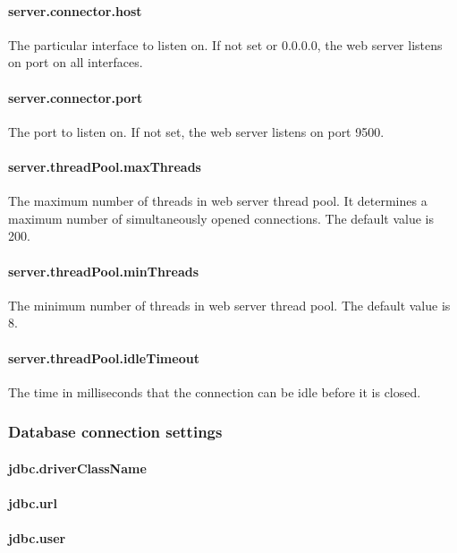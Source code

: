 \documentclass[12pt,a4paper]{report}
\begin{document}
\paragraph{server.connector.host} The particular interface to listen on. If not set or 0.0.0.0, the web server listens on port on all interfaces.

\paragraph{server.connector.port} The port to listen on. If not set, the web server listens on port 9500.

\paragraph{server.threadPool.maxThreads} The maximum number of threads in web server thread pool. It determines a maximum number of simultaneously opened connections. The default value is 200.

\paragraph{server.threadPool.minThreads} The minimum number of threads in web server thread pool. The default value is 8.

\paragraph{server.threadPool.idleTimeout} The time in milliseconds that the connection can be idle before it is closed.

\subsubsection{Database connection settings}

\paragraph{jdbc.driverClassName} 

\paragraph{jdbc.url} 

\paragraph{jdbc.user}
\end{document}
